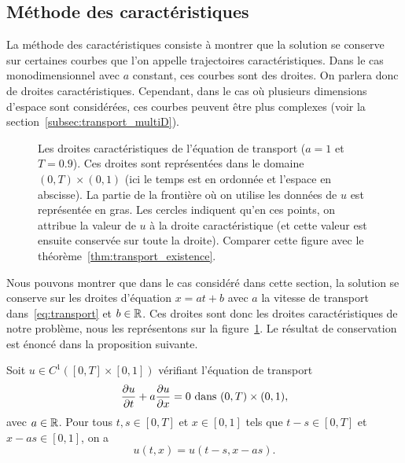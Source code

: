\documentclass[12pt,a4paper,twoside]{article}
\begin{document}
\subsection{M\'ethode des caract\'eristiques}

La m\'ethode des caract\'eristiques consiste \`a montrer que la solution
se conserve sur certaines courbes que l'on appelle trajectoires caract\'eristiques.
Dans le cas monodimensionnel avec $a$ constant, ces courbes sont des droites.
On parlera donc de droites caract\'eristiques.
Cependant, dans le cas o\`u plusieurs dimensions d'espace sont consid\'er\'ees,
ces courbes peuvent \^etre plus complexes (voir la section~\ref{subsec:transport_multiD}).

\begin{figure}
\centering
\begin{tikzpicture}[scale = 9]
  
\end{tikzpicture}
\caption{Les droites caract\'eristiques de l'\'equation de transport
  ($a=1$ et $T=0.9$). Ces droites sont repr\'esent\'ees dans le domaine $(0,T) \times (0,1)$
  (ici le temps est en ordonn\'ee et l'espace en abscisse). La partie de la fronti\`ere
  o\`u on utilise les donn\'ees de $u$ est repr\'esent\'ee en gras. Les cercles indiquent
  qu'en ces points, on attribue la valeur de $u$ \`a la droite caract\'eristique
  (et cette valeur est ensuite conserv\'ee sur toute la droite).
  Comparer cette figure avec le th\'eor\`eme~\ref{thm:transport_existence}.}
\label{fig:D_carac}
\end{figure}

Nous pouvons montrer que dans le cas consid\'er\'e dans cette section,
la solution se conserve sur les droites d'\'equation $x=at+b$ avec 
$a$ la vitesse de transport dans~\eqref{eq:transport} et $b \in \R$.
Ces droites sont donc les droites caract\'eristiques de notre probl\`eme,
nous les repr\'esentons sur la figure~\ref{fig:D_carac}.
Le r\'esultat de conservation est \'enonc\'e dans la proposition suivante.

\begin{proposition}
  \label{prop:droites_carac}
  Soit $u \in C^1([0,T] \times [0,1])$ v\'erifiant l'\'equation de transport
  \begin{align*}
    \dfrac{\partial u}{\partial t} + a \dfrac{\partial u}{\partial x} = 0 
    \dans (0,T) \times (0,1) ,
  \end{align*}
  avec $a \in \R$.
  Pour tous $t,s \in [0,T]$ et $x \in [0,1]$ tels que
  $t-s \in [0,T]$ et $x-as \in [0,1]$, on a
  \[
    u(t,x) = u(t-s , x-as) .
  \]
\end{proposition}
\end{document}
